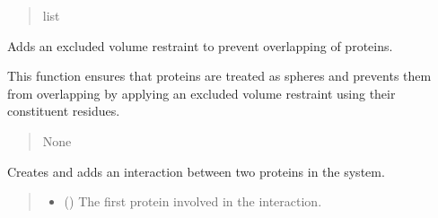 \documentclass[letterpaper,10pt,english]{sphinxmanual}
\begin{document}
\begin{fulllineitems}
\begin{fulllineitems}
\begin{quote}
\begin{description}
\sphinxAtStartPar
list

\end{description}\end{quote}

\end{fulllineitems}


\begin{fulllineitems}
\label{\detokenize{src:src.System_Class.System.add_excluded_volume_restraint}}
\pysigstartsignatures
{}
\pysigstopsignatures
\sphinxAtStartPar
Adds an excluded volume restraint to prevent overlapping of proteins.

\sphinxAtStartPar
This function ensures that proteins are treated as spheres and prevents them from
overlapping by applying an excluded volume restraint using their constituent residues.
\begin{quote}\begin{description}
\sphinxAtStartPar
{}

\sphinxAtStartPar
None

\end{description}\end{quote}

\end{fulllineitems}


\begin{fulllineitems}
\label{\detokenize{src:src.System_Class.System.add_interaction}}
\pysigstartsignatures
{}
\pysigstopsignatures
\sphinxAtStartPar
Creates and adds an interaction between two proteins in the system.
\begin{quote}\begin{description}
\begin{itemize}
\item {} 
\sphinxAtStartPar
{} ({\hyperref[\detokenize{src:src.Protein_Class.Protein}]{}}) \textendash{} The first protein involved in the interaction.


\end{itemize}
\end{description}
\end{quote}
\end{fulllineitems}
\end{fulllineitems}
\end{document}
